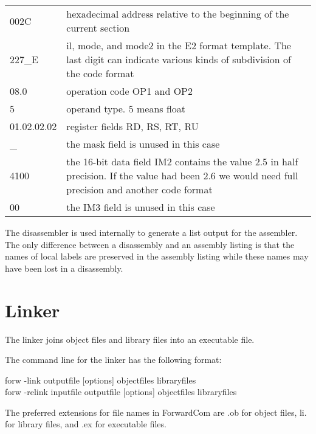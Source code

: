 \documentclass[forwardcom.tex]{subfiles}
\begin{document}
\begin{tabular}{|p{22mm}p{140mm}|}
\hline
002C & hexadecimal address relative to the beginning of the current section\\
227\_E  & il, mode, and mode2 in the E2 format template. The last digit can indicate various kinds of subdivision of the code format\\
08.0 & operation code OP1 and OP2\\
5    & operand type. 5 means float\\
01.02.02.02 & register fields RD, RS, RT, RU\\
\_   & the mask field is unused in this case\\
4100 & the 16-bit data field IM2 contains the value 2.5 in half precision. If the value had been 2.6 we would need full precision and another code format\\
00 & the IM3 field is unused in this case\\
\hline
\end{tabular}
\vspace{4mm}

The disassembler is used internally to generate a list output for the assembler. The only difference between a disassembly and an assembly listing is that the names of local labels are preserved in the assembly listing while these names may have been lost in a disassembly.
\vspace{2mm}


\section{Linker} \label{linker}

The linker joins object files and library files into an executable file.

The command line for the linker has the following format:
\vspace{2mm}

{\ttfamily 
\hspace{5mm} forw -link   outputfile [options] objectfiles libraryfiles \\
\hspace{5mm} forw -relink inputfile outputfile [options] objectfiles libraryfiles
}
\vspace{2mm}

The preferred extensions for file names in ForwardCom are .ob for object files, li. for library files, and .ex for executable files.
\vspace{2mm}
\end{document}
